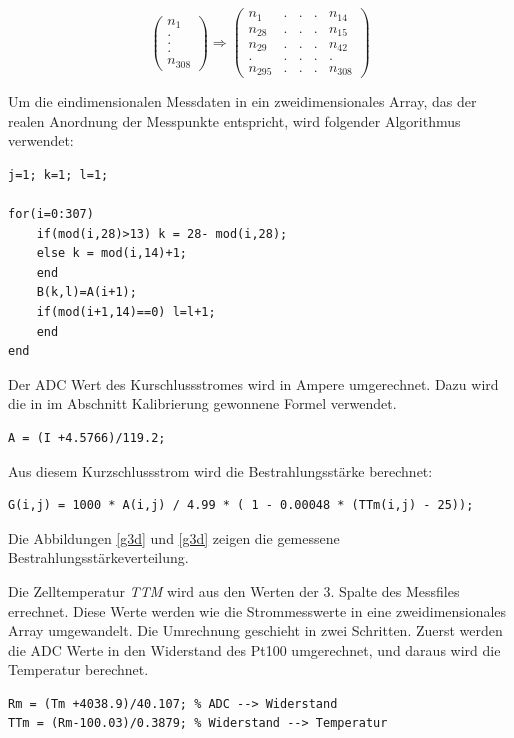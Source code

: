 \documentclass[a4paper,bibtotoc,oneside]{scrbook}
\begin{document}
\begin{equation}
\begin{pmatrix}
n_1 \\ . \\ . \\ . \\ n_{308} 
\end{pmatrix}
\Longrightarrow
\begin{pmatrix}
n_{1}  & . &.& .& n_{14} \\
n_{28} & .& .& . &n_{15}  \\
n_{29}  &. &.& .& n_{42}  \\
. &.& .& . & . \\
n_{295}  &.& .&.& n_{308} 
\end{pmatrix}
\end{equation}

Um die eindimensionalen Messdaten in ein zweidimensionales Array, das der realen Anordnung der Messpunkte entspricht, wird folgender Algorithmus verwendet:
\begin{verbatim}
j=1; k=1; l=1;

for(i=0:307)
    if(mod(i,28)>13) k = 28- mod(i,28);
    else k = mod(i,14)+1;
    end
    B(k,l)=A(i+1);
    if(mod(i+1,14)==0) l=l+1;
    end
end
\end{verbatim}

Der ADC Wert des Kurschlussstromes wird in Ampere umgerechnet. Dazu wird die in im Abschnitt Kalibrierung gewonnene Formel verwendet.
\begin{verbatim}
A = (I +4.5766)/119.2; 
\end{verbatim}
Aus diesem Kurzschlussstrom wird die Bestrahlungsstärke berechnet:
\begin{verbatim}
G(i,j) = 1000 * A(i,j) / 4.99 * ( 1 - 0.00048 * (TTm(i,j) - 25));
\end{verbatim}
Die Abbildungen \ref{g3d} und \ref{g3d} zeigen die gemessene Bestrahlungsstärkeverteilung.

Die Zelltemperatur \textit{TTM} wird aus den Werten der 3. Spalte des Messfiles errechnet. Diese Werte werden wie die Strommesswerte in eine zweidimensionales Array umgewandelt. Die Umrechnung geschieht in zwei Schritten. Zuerst werden die ADC Werte in den Widerstand des Pt100 umgerechnet, und daraus wird die Temperatur berechnet.

\begin{verbatim}
Rm = (Tm +4038.9)/40.107; % ADC --> Widerstand
TTm = (Rm-100.03)/0.3879; % Widerstand --> Temperatur
\end{verbatim}
\end{document}
